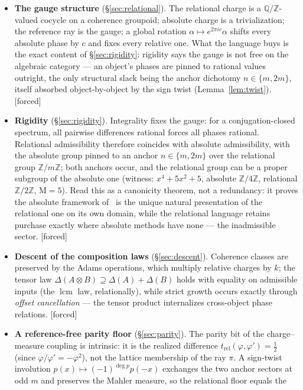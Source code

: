 \documentclass[11pt]{article}
\theoremstyle{plain}
\theoremstyle{definition}
\theoremstyle{remark}
\newcommand{\Q}{\mathbb{Q}}
\newcommand{\Z}{\mathbb{Z}}
\newcommand{\Mah}{\mathrm{M}}
\DeclareMathOperator{\lcm}{lcm}
\newcommand{\tors}{\Q/\Z}
\newcommand{\F}{\textnormal{[forced]}}
\begin{document}
\begin{itemize}
\item \textbf{The gauge structure} (\S\ref{sec:relational}). The relational charge
  is a $\tors$-valued cocycle on a coherence groupoid; absolute charge is a
  trivialization; the reference ray is the gauge; a global rotation
  $\alpha\mapsto e^{2\pi ic}\alpha$ shifts every absolute phase by $c$ and fixes
  every relative one. What the language buys is the exact content of
  \S\ref{sec:rigidity}: rigidity says the gauge is not free on the
  algebraic category --- an object's phases are pinned to rational values
  outright, the only structural slack being the anchor dichotomy
  $n\in\{m,2m\}$, itself absorbed object-by-object by the sign twist
  (Lemma~\ref{lem:twist}). \F
\item \textbf{Rigidity} (\S\ref{sec:rigidity}). Integrality fixes the gauge: for a
  conjugation-closed spectrum, all pairwise differences rational forces all phases
  rational. Relational admissibility therefore coincides with absolute
  admissibility, with the absolute group pinned to an anchor $n\in\{m,2m\}$ over
  the relational group $\Z/m\Z$; both anchors occur, and the relational group can
  be a proper subgroup of the absolute one (witness: $x^4+5x^2+5$, absolute
  $\Z/4\Z$, relational $\Z/2\Z$, $\Mah=5$). Read this as a canonicity
  theorem, not a redundancy: it proves the absolute framework of~\cite{CMC}
  is the unique natural presentation of the relational one on its own domain,
  while the relational language retains purchase exactly where absolute
  methods have none --- the inadmissible sector. \F
\item \textbf{Descent of the composition laws} (\S\ref{sec:descent}). Coherence
  classes are preserved by the Adams operations, which multiply relative charges by
  $k$; the tensor law $\Delta(A\otimes B)\supseteq\Delta(A)+\Delta(B)$ holds with
  equality on admissible inputs (the $\lcm$ law, relationally), while strict
  growth occurs exactly through \emph{offset cancellation} --- the tensor product
  internalizes cross-object phase relations. \F
\item \textbf{A reference-free parity floor} (\S\ref{sec:parity}). The parity bit
  of the charge--measure coupling is intrinsic: it is the realized difference
  $t_{\mathrm{rel}}(\varphi,\varphi')=\tfrac12$ (since $\varphi/\varphi'=
  -\varphi^2$), not the lattice membership of the ray $\pi$. A sign-twist
  involution $p(x)\mapsto(-1)^{\deg p}p(-x)$ exchanges the two anchor sectors at
  odd $m$ and preserves the Mahler measure, so the relational floor equals the

\end{itemize}
\end{document}
